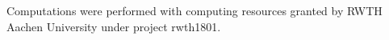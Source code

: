 Computations were performed with computing resources granted by RWTH Aachen University under project rwth1801.